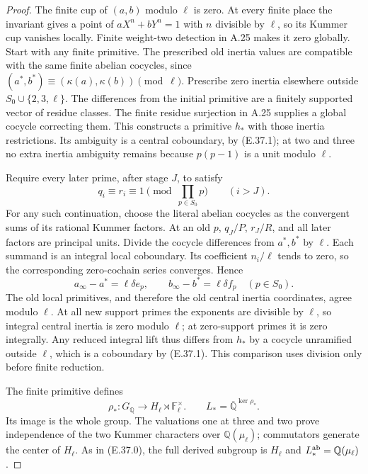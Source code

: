 \begin{proof}
The finite cup of $(a,b)$ modulo $\ell$ is
zero. At every finite place the invariant gives
a point of $aX^n+bY^n=1$ with $n$ divisible
by $\ell$, so its Kummer cup vanishes locally.
Finite weight-two detection in A.25 makes it
zero globally. Start with any finite primitive.
The prescribed old inertia values are compatible
with the same finite abelian cocycles, since
$(a^*,b^*)\equiv(\kappa(a),\kappa(b))\pmod\ell$.
Prescribe zero inertia elsewhere outside
$S_0\cup\{2,3,\ell\}$.
The differences from the initial primitive are
a finitely supported vector of residue classes.
The finite residue surjection in A.25 supplies
a global cocycle correcting them.
This constructs a primitive $h_*$ with those
inertia restrictions. Its ambiguity is a
central coboundary, by (E.37.1); at two and
three no extra inertia ambiguity remains because
$p(p-1)$ is a unit modulo $\ell$.

Require every later prime, after stage $J$, to
satisfy
\[
 q_i\equiv r_i\equiv1\pmod{\prod_{p\in S_0}p}
                  \qquad(i>J).
 \tag{E.61.3}
\]
For any such continuation, choose the literal
abelian cocycles as the convergent sums of
its rational Kummer factors. At an old $p$,
$q_J/P$, $r_J/R$, and all later factors are
principal units. Divide the cocycle differences
from $a^*,b^*$ by $\ell$. Each summand is an
integral local coboundary. Its coefficient
$n_i/\ell$ tends to zero, so the corresponding
zero-cochain series converges. Hence
\[
 a_\infty-a^*=\ell\delta e_p,\qquad
 b_\infty-b^*=\ell\delta f_p
                       \quad(p\in S_0).
 \tag{E.61.4}
\]
The old local primitives, and therefore the old
central inertia coordinates, agree modulo $\ell$.
At all new support primes the exponents are
divisible by $\ell$, so integral central inertia
is zero modulo $\ell$; at zero-support primes
it is zero integrally.
Any reduced integral lift thus differs from
$h_*$ by a cocycle unramified outside $\ell$,
which is a coboundary by (E.37.1).
This comparison uses division only before
finite reduction.

The finite primitive defines
\[
 \rho_*:G_{\mathbb Q}\longrightarrow
 H_\ell\rtimes\mathbb F_\ell^\times .
 \qquad L_*=\overline{\mathbb Q}^{\ker\rho_*}.
\]
Its image is the whole group. The valuations
one at three and two prove independence of
the two Kummer characters over $\mathbb Q(\mu_\ell)$;
commutators generate the center of $H_\ell$.
As in (E.37.0), the full derived subgroup
is $H_\ell$ and
$L_*^{\rm ab}=\mathbb Q(\mu_\ell)$.


\end{proof}
